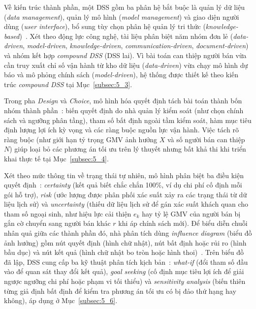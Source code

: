 \documentclass[a4paper]{article}
\begin{document}
Về kiến trúc thành phần, một DSS gồm ba phân hệ bắt buộc là quản lý dữ liệu (\textit{data management}), quản lý mô hình (\textit{model management}) và giao diện người dùng (\textit{user interface}), bổ sung tùy chọn phân hệ quản lý tri thức (\textit{knowledge-based})~\cite{bib:turban_dss}. Xét theo động lực công nghệ, tài liệu phân biệt năm nhóm đơn lẻ (\textit{data-driven}, \textit{model-driven}, \textit{knowledge-driven}, \textit{communication-driven}, \textit{document-driven}) và nhóm kết hợp \textit{compound DSS} (DSS lai). Vì bài toán can thiệp người bán vừa cần truy xuất chỉ số vận hành từ kho dữ liệu (\textit{data-driven}) vừa chạy mô hình dự báo và mô phỏng chính sách (\textit{model-driven}), hệ thống được thiết kế theo kiến trúc \textit{compound DSS} tại Mục~\ref{subsec:5_3}.

Trong pha \textit{Design} và \textit{Choice}, mô hình hóa quyết định tách bài toán thành bốn nhóm thành phần~\cite{bib:turban_dss}: biến quyết định do nhà quản lý kiểm soát (như chọn chính sách và ngưỡng phân tầng), tham số bất định ngoài tầm kiểm soát, hàm mục tiêu định lượng lợi ích kỳ vọng và các ràng buộc nguồn lực vận hành. Việc tách rõ ràng buộc (như giới hạn tỷ trọng GMV ảnh hưởng $X$ và số người bán can thiệp $N$) giúp loại bỏ các phương án tối ưu trên lý thuyết nhưng bất khả thi khi triển khai thực tế tại Mục~\ref{subsec:5_4}.

Xét theo mức thông tin về trạng thái tự nhiên, mô hình phân biệt ba điều kiện quyết định~\cite{bib:turban_dss}: \textit{certainty} (kết quả biết chắc chắn 100\%, ví dụ chi phí cố định mỗi gói hỗ trợ), \textit{risk} (ước lượng được phân phối xác suất xảy ra các trạng thái từ dữ liệu lịch sử) và \textit{uncertainty} (thiếu dữ liệu lịch sử để gán xác suất khách quan cho tham số ngoại sinh, như hiệu lực cải thiện $e_k$ hay tỷ lệ GMV của người bán bị gắn cờ chuyển sang người bán khác $r$ khi áp chính sách mới). Để biểu diễn chuỗi nhân quả giữa các thành phần đó, nhà phân tích dùng \textit{influence diagram} (biểu đồ ảnh hưởng) gồm nút quyết định (hình chữ nhật), nút bất định hoặc rủi ro (hình bầu dục) và nút kết quả (hình chữ nhật bo tròn hoặc hình thoi)~\cite{bib:turban_dss}. Trên biểu đồ đã lập, DSS cung cấp ba kỹ thuật phân tích kịch bản~\cite{bib:turban_dss}: \textit{what-if} (đổi tham số đầu vào để quan sát thay đổi kết quả), \textit{goal seeking} (cố định mục tiêu lợi ích để giải ngược ngưỡng chi phí hoặc phạm vi tối thiểu) và \textit{sensitivity analysis} (biến thiên từng giả định bất định để kiểm tra phương án tối ưu có bị đảo thứ hạng hay không), áp dụng ở Mục~\ref{subsec:5_6}.
\end{document}
